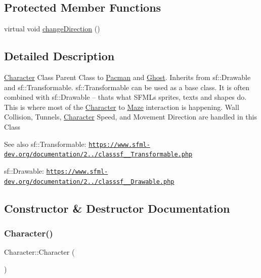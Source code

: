 \subsection*{Protected Member Functions}
\begin{DoxyCompactItemize}
\item 
virtual void \hyperlink{class_character_ab4c0dc6f72c78607b921cf312e10ed35}{change\+Direction} ()
\end{DoxyCompactItemize}


\subsection{Detailed Description}
\hyperlink{class_character}{Character} Class Parent Class to \hyperlink{class_pacman}{Pacman} and \hyperlink{class_ghost}{Ghost}. Inherits from sf\+::\+Drawable and sf\+::\+Transformable. sf\+::\+Transformable can be used as a base class. It is often combined with sf\+::\+Drawable – that\textquotesingle{}s what S\+F\+ML\textquotesingle{}s sprites, texts and shapes do. This is where most of the \hyperlink{class_character}{Character} to \hyperlink{class_maze}{Maze} interaction is happening. Wall Collision, Tunnels, \hyperlink{class_character}{Character} Speed, and Movement Direction are handled in this Class \begin{DoxySeeAlso}{See also}
sf\+::\+Transformable\+: \href{https://www.sfml-dev.org/documentation/2.4.2/classsf_1_1Transformable.php}{\tt https\+://www.\+sfml-\/dev.\+org/documentation/2../classsf\+\_\+\_\+Transformable.\+php} 

sf\+::\+Drawable\+: \href{https://www.sfml-dev.org/documentation/2.4.2/classsf_1_1Drawable.php}{\tt https\+://www.\+sfml-\/dev.\+org/documentation/2../classsf\+\_\+\_\+Drawable.\+php} 
\end{DoxySeeAlso}


\subsection{Constructor \& Destructor Documentation}
\mbox{\label{class_character_adc27bdd255876169bad2ed0bae0cffb5}} 
\subsubsection{\texorpdfstring{Character()}{Character()}}
{\footnotesize\ttfamily Character\+::\+Character (\begin{DoxyParamCaption}{ }\end{DoxyParamCaption})}

